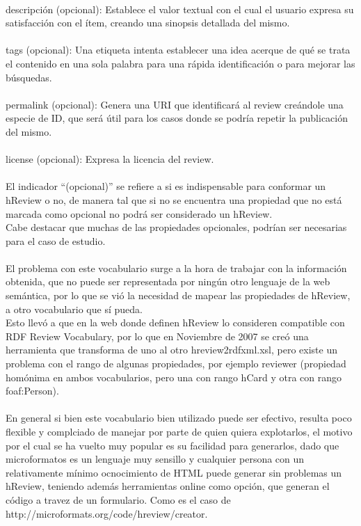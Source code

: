 \\
descripción (opcional): Establece el valor textual con el cual el usuario expresa su satisfacción con el ítem, creando una 
sinopsis detallada del mismo. \\
\\
tags (opcional): Una etiqueta intenta establecer una idea acerque de qué se trata el contenido en una sola palabra para una rápida identificación 
o para mejorar las búsquedas. \\
\\
permalink (opcional): Genera una URI que identificará al review creándole una especie de ID, que será útil para los casos donde 
se podría repetir la publicación del mismo. \\
\\
license (opcional): Expresa la licencia del review.\\
\\
El indicador ``(opcional)'' se refiere a si es indispensable para conformar un hReview o no, de manera tal que si no se encuentra una 
propiedad que no está marcada como opcional no podrá ser considerado un hReview.\\
Cabe destacar que muchas de las propiedades opcionales, podrían ser necesarias para el caso de estudio.\\
\\
El problema con este vocabulario surge a la hora de trabajar con la información obtenida, que no puede ser representada por ningún otro 
lenguaje de la web semántica, por lo que se vió la necesidad de mapear las propiedades de hReview, a otro vocabulario que sí pueda.\\
Esto llevó a que en la web donde definen hReview lo consideren compatible con RDF Review Vocabulary, por lo que en Noviembre de 2007 
se creó una herramienta que transforma de uno al otro hreview2rdfxml.xsl,  pero existe un problema con el rango de algunas 
propiedades, por ejemplo reviewer (propiedad homónima en ambos vocabularios, pero una con rango hCard y otra con rango foaf:Person).\\
\\
En general si bien este vocabulario bien utilizado puede ser efectivo, resulta poco flexible y complciado de manejar por parte 
de quien quiera explotarlos, el motivo por el cual se ha vuelto muy popular es su facilidad para generarlos, dado que 
microformatos es un lenguaje muy sensillo y cualquier persona con un relativamente mínimo ocnocimiento de HTML puede generar 
sin problemas un hReview, teniendo además herramientas online como opción, que generan el código a travez de un formulario. 
Como es el caso de http://microformats.org/code/hreview/creator. 